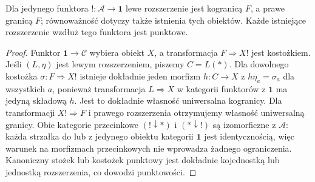 \begin{wniosek}\label{cat:cor:kan-limit}
Dla jedynego funktora $!:\mathcal A\to\mathbf1$ lewe rozszerzenie jest kogranicą $F$, a prawe granicą $F$; równoważność dotyczy także istnienia tych obiektów. Każde istniejące rozszerzenie wzdłuż tego funktora jest punktowe.
\end{wniosek}
\begin{proof}
Funktor $\mathbf1\to\mathcal C$ wybiera obiekt $X$, a transformacja $F\Rightarrow X!$ jest kostożkiem. Jeśli $(L,\eta)$ jest lewym rozszerzeniem, piszemy $C=L(*)$. Dla dowolnego kostożka $\sigma:F\Rightarrow X!$ istnieje dokładnie jeden morfizm $h:C\to X$ z $h\eta_a=\sigma_a$ dla wszystkich $a$, ponieważ transformacja $L\Rightarrow X$ w kategorii funktorów z $\mathbf1$ ma jedyną składową $h$. Jest to dokładnie własność uniwersalna kogranicy. Dla transformacji $X!\Rightarrow F$ i prawego rozszerzenia otrzymujemy własność uniwersalną granicy. Obie kategorie przecinkowe $(!\downarrow *)$ i $(*\downarrow !)$ są izomorficzne z $\mathcal A$: każda strzałka do lub z jedynego obiektu kategorii $\mathbf1$ jest identycznością, więc warunek na morfizmach przecinkowych nie wprowadza żadnego ograniczenia. Kanoniczny stożek lub kostożek punktowy jest dokładnie kojednostką lub jednostką rozszerzenia, co dowodzi punktowości.
\end{proof}

